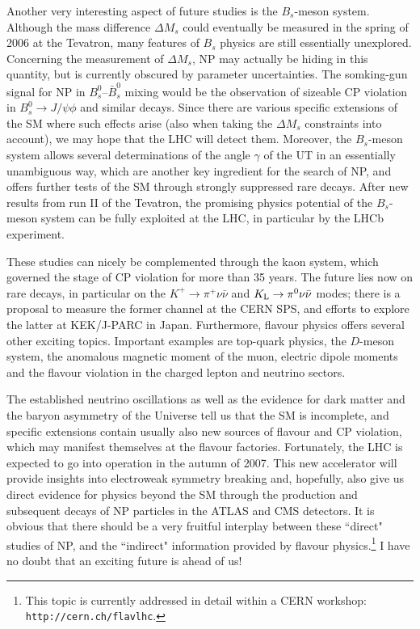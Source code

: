 \documentclass[11pt]{cernrep}
\begin{document}
Another very interesting aspect of future studies is the $B_s$-meson system.
Although the mass difference $\Delta M_s$ could eventually be measured
in the spring of 2006 at the Tevatron, many features of $B_s$ physics
are still essentially unexplored. Concerning the measurement of $\Delta M_s$,
NP may actually be hiding in this quantity, but is currently obscured by parameter
uncertainties. The somking-gun signal for NP in $B^0_s$--$\bar B^0_s$
mixing would be the observation of sizeable CP violation in $B^0_s\to J/\psi \phi$
and similar decays. Since there are various specific extensions of the
SM where such effects arise (also when taking the $\Delta M_s$ constraints into
account), we may hope that the LHC will detect them. Moreover, the $B_s$-meson
system allows several determinations of the angle $\gamma$ of the UT in an 
essentially unambiguous way, which are another key ingredient for the search
of NP, and offers further tests of the SM through strongly suppressed rare decays. 
After new results from run II of the Tevatron, the promising physics potential of
the $B_s$-meson system can be fully exploited at the LHC, in particular by 
the LHCb experiment. 

These studies can nicely be complemented through the kaon system, which 
governed the stage of CP violation for more than 35 years. The future lies now 
on rare decays, in particular on the $K^+\to\pi^+\nu\bar\nu$ and
$K_{\rm L}\to\pi^0\nu\bar\nu$ modes; there is a proposal to measure 
the former channel at the CERN SPS, and efforts to explore the latter 
at KEK/J-PARC in Japan. Furthermore, flavour physics offers several other
exciting topics. Important examples are top-quark physics, the $D$-meson 
system, the anomalous magnetic moment of the muon, electric dipole moments
and the flavour violation in the charged lepton and neutrino sectors. 

The established neutrino oscillations as well as the evidence for dark matter and the baryon asymmetry of the Universe tell us that the SM is incomplete, and specific 
extensions contain usually also new sources of flavour and CP violation, which 
may manifest themselves at the flavour factories. Fortunately, the LHC is expected 
to go into operation in the autumn of 2007. This new accelerator will provide 
insights  into electroweak symmetry breaking and, hopefully, also give us direct 
evidence for physics beyond the SM through the production and subsequent 
decays of NP particles in the ATLAS and CMS detectors. It is obvious that there 
should be a very fruitful interplay between these ``direct" studies of NP, and the 
``indirect" information provided by flavour physics.\footnote{This topic is currently 
addressed in detail within a CERN workshop: {\tt http://cern.ch/flavlhc}.}
I have no doubt that an exciting future is ahead of us!
\end{document}
